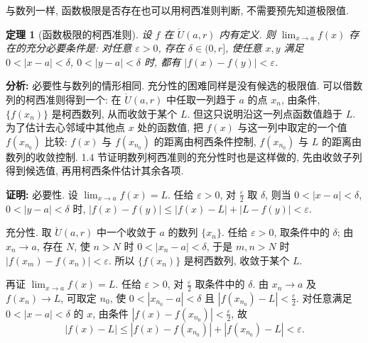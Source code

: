 \documentclass[UTF8,openany]{ctexbook}
\theoremstyle{chinesetextbook}
\newtheorem{theorem}{定理}[section]
\newenvironment{cnproof}{\par\indent\textbf{证明:} \ignorespaces}{\par}
\begin{document}
与数列一样, 函数极限是否存在也可以用柯西准则判断, 不需要预先知道极限值.
\begin{theorem}[函数极限的柯西准则]
设 $f$ 在 $\mathring U(a,r)$ 内有定义. 则 $\displaystyle\lim_{x\to a}f(x)$ 存在的充分必要条件是: 对任意 $\varepsilon>0$, 存在 $\delta\in(0,r]$, 使任意 $x,y$ 满足 $0<|x-a|<\delta$, $0<|y-a|<\delta$ 时, 都有 $|f(x)-f(y)|<\varepsilon$.
\end{theorem}
\par\indent\textbf{分析:} 必要性与数列的情形相同. 充分性的困难同样是没有候选的极限值. 可以借数列的柯西准则得到一个: 在 $\mathring U(a,r)$ 中任取一列趋于 $a$ 的点 $x_n$, 由条件, $\{f(x_n)\}$ 是柯西数列, 从而收敛于某个 $L$. 但这只说明沿这一列点函数值趋于 $L$. 为了估计去心邻域中其他点 $x$ 处的函数值, 把 $f(x)$ 与这一列中取定的一个值 $f(x_{n_0})$ 比较: $f(x)$ 与 $f(x_{n_0})$ 的距离由柯西条件控制, $f(x_{n_0})$ 与 $L$ 的距离由数列的收敛控制. 1.4 节证明数列柯西准则的充分性时也是这样做的, 先由收敛子列得到候选值, 再用柯西条件估计其余各项.
\begin{cnproof}
必要性. 设 $\displaystyle\lim_{x\to a}f(x)=L$. 任给 $\varepsilon>0$, 对 $\displaystyle\frac\varepsilon2$ 取 $\delta$, 则当 $0<|x-a|<\delta$, $0<|y-a|<\delta$ 时, $|f(x)-f(y)|\le|f(x)-L|+|L-f(y)|<\varepsilon$.

充分性. 取 $\mathring U(a,r)$ 中一个收敛于 $a$ 的数列 $\{x_n\}$. 任给 $\varepsilon>0$, 取条件中的 $\delta$; 由 $x_n\to a$, 存在 $N$, 使 $n>N$ 时 $0<|x_n-a|<\delta$, 于是 $m,n>N$ 时 $|f(x_m)-f(x_n)|<\varepsilon$. 所以 $\{f(x_n)\}$ 是柯西数列, 收敛于某个 $L$.

再证 $\displaystyle\lim_{x\to a}f(x)=L$. 任给 $\varepsilon>0$, 对 $\displaystyle\frac\varepsilon2$ 取条件中的 $\delta$. 由 $x_n\to a$ 及 $f(x_n)\to L$, 可取定 $n_0$, 使 $0<|x_{n_0}-a|<\delta$ 且 $\displaystyle|f(x_{n_0})-L|<\frac\varepsilon2$. 对任意满足 $0<|x-a|<\delta$ 的 $x$, 由条件 $\displaystyle|f(x)-f(x_{n_0})|<\frac\varepsilon2$, 故
\[
|f(x)-L|\le|f(x)-f(x_{n_0})|+|f(x_{n_0})-L|<\varepsilon.
\]
\end{cnproof}
\end{document}
